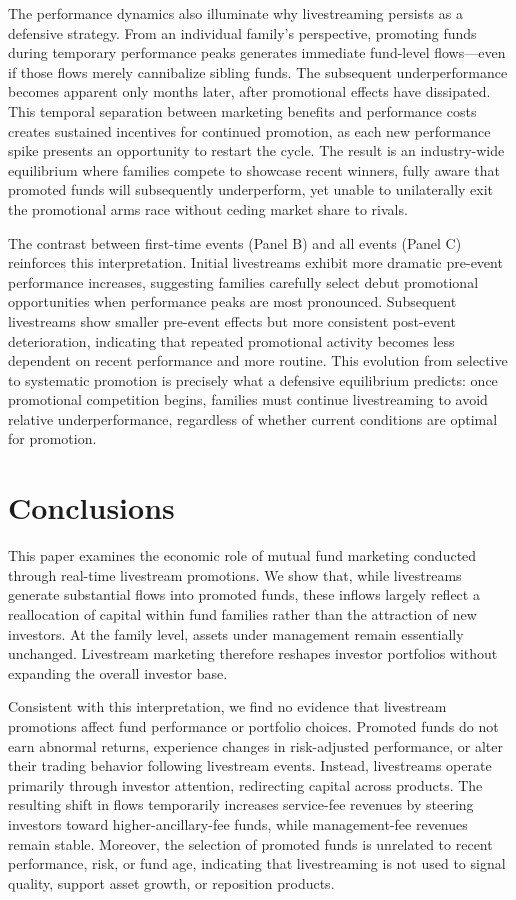 \documentclass[12pt]{article}
\begin{document}
The performance dynamics also illuminate why livestreaming persists as a defensive strategy. From an individual family's perspective, promoting funds during temporary performance peaks generates immediate fund-level flows—even if those flows merely cannibalize sibling funds. The subsequent underperformance becomes apparent only months later, after promotional effects have dissipated. This temporal separation between marketing benefits and performance costs creates sustained incentives for continued promotion, as each new performance spike presents an opportunity to restart the cycle. The result is an industry-wide equilibrium where families compete to showcase recent winners, fully aware that promoted funds will subsequently underperform, yet unable to unilaterally exit the promotional arms race without ceding market share to rivals.

The contrast between first-time events (Panel B) and all events (Panel C) reinforces this interpretation. Initial livestreams exhibit more dramatic pre-event performance increases, suggesting families carefully select debut promotional opportunities when performance peaks are most pronounced. Subsequent livestreams show smaller pre-event effects but more consistent post-event deterioration, indicating that repeated promotional activity becomes less dependent on recent performance and more routine. This evolution from selective to systematic promotion is precisely what a defensive equilibrium predicts: once promotional competition begins, families must continue livestreaming to avoid relative underperformance, regardless of whether current conditions are optimal for promotion.

\section{Conclusions}\label{sec:conclusions}

This paper examines the economic role of mutual fund marketing conducted through real-time livestream promotions. We show that, while livestreams generate substantial flows into promoted funds, these inflows largely reflect a reallocation of capital within fund families rather than the attraction of new investors. At the family level, assets under management remain essentially unchanged. Livestream marketing therefore reshapes investor portfolios without expanding the overall investor base.

Consistent with this interpretation, we find no evidence that livestream promotions affect fund performance or portfolio choices. Promoted funds do not earn abnormal returns, experience changes in risk-adjusted performance, or alter their trading behavior following livestream events. Instead, livestreams operate primarily through investor attention, redirecting capital across products. The resulting shift in flows temporarily increases service-fee revenues by steering investors toward higher-ancillary-fee funds, while management-fee revenues remain stable. Moreover, the selection of promoted funds is unrelated to recent performance, risk, or fund age, indicating that livestreaming is not used to signal quality, support asset growth, or reposition products.
\end{document}
